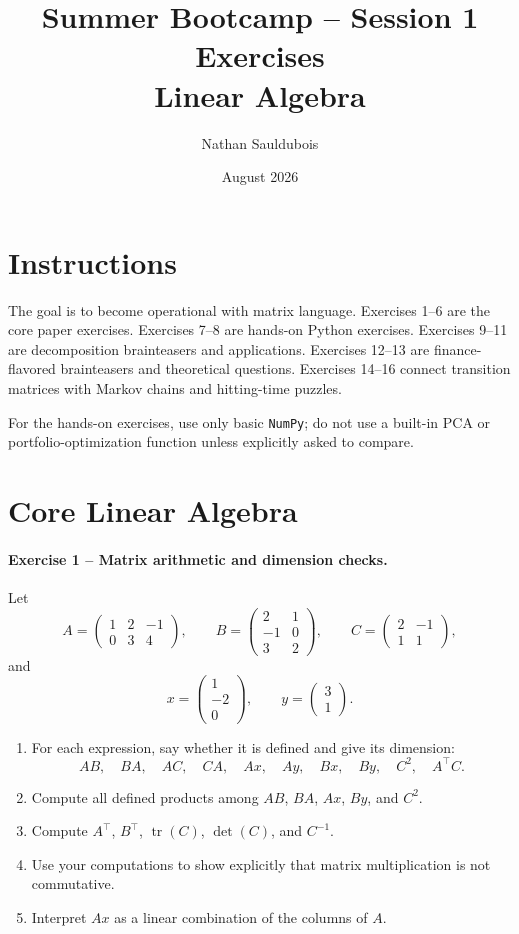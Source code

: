 \documentclass[10pt]{article}
\title{Summer Bootcamp -- Session 1 Exercises\\Linear Algebra}
\author{Nathan Sauldubois}
\date{August 2026}
\newcommand{\tr}{\operatorname{tr}}
\begin{document}
\maketitle

\section*{Instructions}

The goal is to become operational with matrix language. Exercises 1--6 are the
core paper exercises. Exercises 7--8 are hands-on Python exercises. Exercises
9--11 are decomposition brainteasers and applications. Exercises 12--13 are
finance-flavored brainteasers and theoretical questions. Exercises 14--16
connect transition matrices with Markov chains and hitting-time puzzles.

For the hands-on exercises, use only basic \texttt{NumPy}; do not use a built-in
PCA or portfolio-optimization function unless explicitly asked to compare.

\section{Core Linear Algebra}

\paragraph{Exercise 1 -- Matrix arithmetic and dimension checks.}
Let
\[
A=\begin{pmatrix}
1&2&-1\\
0&3&4
\end{pmatrix},\qquad
B=\begin{pmatrix}
2&1\\
-1&0\\
3&2
\end{pmatrix},\qquad
C=\begin{pmatrix}
2&-1\\
1&1
\end{pmatrix},
\]
and
\[
x=\begin{pmatrix}1\\-2\\0\end{pmatrix},\qquad
y=\begin{pmatrix}3\\1\end{pmatrix}.
\]

\begin{enumerate}
\item For each expression, say whether it is defined and give its dimension:
\[
AB,\quad BA,\quad AC,\quad CA,\quad Ax,\quad Ay,\quad Bx,\quad By,\quad
C^2,\quad A^\top C.
\]
\item Compute all defined products among $AB$, $BA$, $Ax$, $By$, and $C^2$.
\item Compute $A^\top$, $B^\top$, $\tr(C)$, $\det(C)$, and $C^{-1}$.
\item Use your computations to show explicitly that matrix multiplication is
not commutative.
\item Interpret $Ax$ as a linear combination of the columns of $A$.
\end{enumerate}
\end{document}
